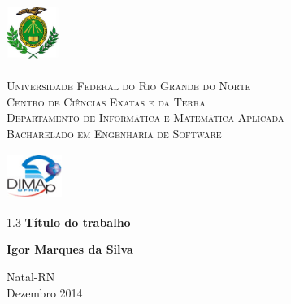 
\begin{titlepage}
	\begin{center}
		
		\begin{minipage}{2cm}
			\begin{center}
				\includegraphics[width=1.7cm, height=2.0cm]{Imagens/Brasao-UFRN.jpg}
			\end{center}
		\end{minipage}
		\begin{minipage}{11cm}
			\begin{center}
				\begin{espacosimples}
					{\small \textsc{Universidade Federal do Rio Grande do Norte}			\\
							  \textsc{Centro de Ciências Exatas e da Terra}						\\
							  \textsc{Departamento de Informática e Matemática Aplicada}	\\
							  \textsc{Bacharelado em Engenharia de Software}}
				\end{espacosimples}
			\end{center}
		\end{minipage}
		\begin{minipage}{2cm}
			\begin{center}
				\includegraphics[width=1.8cm, height=1.5cm]{Imagens/Logotipo-DIMAp.jpg}
			\end{center}
		\end{minipage}
			
		\vspace{6cm}
						
		{\setlength{\baselineskip}%
		{1.3\baselineskip}
		{\LARGE \textbf{Título do trabalho}}\par}
			
		\vspace{4cm}
			
		{\large \textbf{Igor Marques da Silva}}
						
		\vspace{7cm}
		
		Natal-RN\\Dezembro 2014
	\end{center}
\end{titlepage}